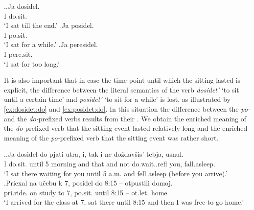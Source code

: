 \ex.\ag.\label{ex:dosidel}Ja dosidel.\\
I do.sit.\\
\trans `I sat till the end.'
\bg.\label{ex:posidel}Ja posidel.\\
I po.sit.\\
\trans `I sat for a while.'
\bg.\label{ex:peresidel}Ja peresidel.\\
I pere.sit.\\
\trans `I sat for too long.'

It is also important that in case the time point until which the sitting lasted is explicit, the difference between the literal semantics of the verb \textit{dosidet'} `to sit until a certain time' and \textit{posidet'} `to sit for a while' is lost, as illustrated by \ref{ex:dosidet:do} and \ref{ex:posidet:do}. In this situation the difference between the \textit{po-} and the \textit{do-}prefixed verbs results from their . We obtain the enriched meaning of the \textit{do-}prefixed verb that the sitting event lasted relatively long and the enriched meaning of the \textit{po-}prefixed verb that the sitting event was rather short. 

\ex.\ag.\label{ex:dosidet:do}Ja dosidel do pjati utra, i, tak i ne do\v{z}dav\v{s}is' tebja, usnul.\\
I do.sit. until 5 morning and that and not do.wait..refl you, fall.asleep.\\
\trans `I sat there waiting for you until 5 a.m. and fell asleep (before you arrive).'\\
\bg.\label{ex:posidet:do}Priexal na u\v{c}ebu k 7, posidel do 8:15 -- otpustili domoj.\\
pri.ride. on study to 7, po.sit. until 8:15 -- ot.let. home\\
\trans `I arrived for the class at 7, sat there until 8:15 and then I was free to go home.'

